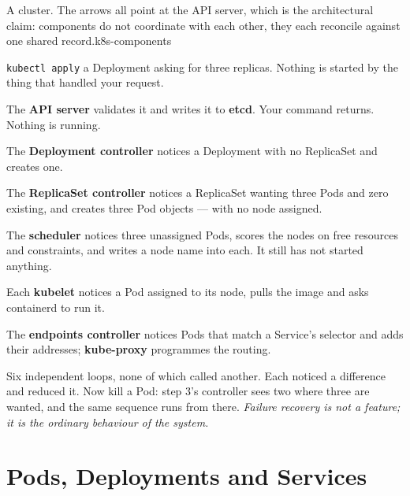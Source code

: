 {A cluster. The arrows all point at the API server, which is the architectural
claim: components do not coordinate with each other, they each reconcile
against one shared record.}{k8s-components}

\begin{conceptbox}
\texttt{kubectl apply} a Deployment asking for three replicas. Nothing is
started by the thing that handled your request.

\begin{tight}
  \item The \textbf{API server} validates it and writes it to \textbf{etcd}.
        Your command returns. Nothing is running.
  \item The \textbf{Deployment controller} notices a Deployment with no
        ReplicaSet and creates one.
  \item The \textbf{ReplicaSet controller} notices a ReplicaSet wanting three
        Pods and zero existing, and creates three Pod objects --- with no node
        assigned.
  \item The \textbf{scheduler} notices three unassigned Pods, scores the nodes
        on free resources and constraints, and writes a node name into each.
        It still has not started anything.
  \item Each \textbf{kubelet} notices a Pod assigned to its node, pulls the
        image and asks containerd to run it.
  \item The \textbf{endpoints controller} notices Pods that match a Service's
        selector and adds their addresses; \textbf{kube-proxy} programmes the
        routing.
\end{tight}

\smallskip
Six independent loops, none of which called another. Each noticed a difference
and reduced it. Now kill a Pod: step 3's controller sees two where three are
wanted, and the same sequence runs from there. \emph{Failure recovery is not a
feature; it is the ordinary behaviour of the system.}
\end{conceptbox}

\section{Pods, Deployments and Services}

